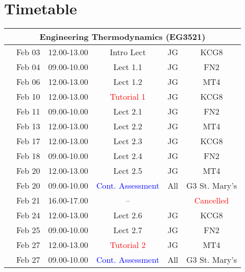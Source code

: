 \documentclass[11pt,oneside,a4paper]{article}
\begin{document}
\section{Timetable}


\begin{center}
\begin{tabular}{||c||c|c|c|c|c||}
\hline\hline
\multicolumn{6}{||c||}{Engineering Thermodynamics (EG3521)} \\
\hline\hline
\multirow{3}{*}{\color{red}{Week 30}} & Feb 03   & 12.00-13.00 & Intro Lect & JG  & KCG8 \\
                                      & Feb 04   & 09.00-10.00 & Lect  1.1  & JG  & FN2  \\
                                      & Feb 06   & 12.00-13.00 & Lect  1.2  & JG  & MT4  \\
\hline
\multirow{3}{*}{\color{red}{Week 31}} & Feb 10   & 12.00-13.00 & \textcolor{red}{Tutorial 1} & JG  & KCG8 \\
                                      & Feb 11   & 09.00-10.00 & Lect  2.1  & JG  & FN2 \\
                                      & Feb 13   & 12.00-13.00 & Lect  2.2  & JG  & MT4  \\
\hline
\multirow{3}{*}{\color{red}{Week 32}} & Feb 17   & 12.00-13.00 & Lect  2.3  & JG  & KCG8 \\
                                      & Feb 18   & 09.00-10.00 & Lect  2.4  & JG  & FN2  \\
                                      & Feb 20   & 12.00-13.00 & Lect  2.5  & JG  & MT4  \\
                                      & Feb 20   & 09.00-10.00 & \textcolor{blue}{Cont. Assessment} & All & G3 St. Mary's \\
                                      & Feb 21   & 16.00-17.00 & --         &     & \textcolor{red}{Cancelled} \\
\hline
\multirow{3}{*}{\color{red}{Week 33}} & Feb 24   & 12.00-13.00 & Lect  2.6  & JG  & KCG8 \\
                                      & Feb 25   & 09.00-10.00 & Lect  2.7  & JG  & FN2  \\
                                      & Feb 27   & 12.00-13.00 & \textcolor{red}{Tutorial 2} & JG  & MT4  \\
                                      & Feb 27   & 09.00-10.00 & \textcolor{blue}{Cont. Assessment} & All  &  G3 St. Mary's \\

\end{tabular}
\end{center}
\end{document}
